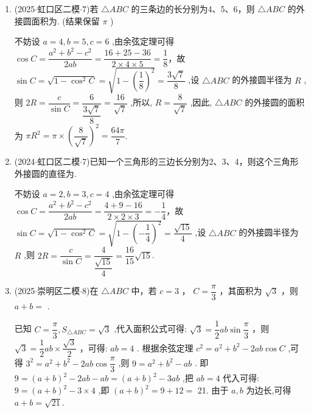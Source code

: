 \begin{enumerate}
    \item (2025$\cdot$虹口区二模$\cdot$7)若 $\bigtriangleup  {ABC}$ 的三条边的长分别为4、5、6，则 $\bigtriangleup  {ABC}$ 的外接圆面积为. (结果保留 $\pi$ )
    \begin{jieda}
        不妨设 $a = 4,b = 5,c = 6$ ,由余弦定理可得 $\cos C =  \dfrac{{a}^{2} + {b}^{2} - {c}^{2}}{2ab} = \dfrac{{16} + {25} - {36}}{2 \times  4 \times  5} = \dfrac{1}{8}$，故 $\sin C =  \sqrt{1 - {\cos }^{2}C} = \sqrt{1 - {\left( \dfrac{1}{8}\right) }^{2}} = \dfrac{3\sqrt{7}}{8}$ ,设 $\bigtriangleup {ABC}$ 的外接圆半径为 $R$ ,则 ${2R} = \dfrac{c}{\sin C} = \dfrac{6}{\dfrac{3\sqrt{7}}{8}} = \dfrac{16}{\sqrt{7}}$ ,所以, $R = \dfrac{8}{\sqrt{7}}$ ,因此, $\bigtriangleup {ABC}$ 的外接圆的面积为 $\pi R^{2} = \pi  \times  {\left( \dfrac{8}{\sqrt{7}}\right) }^{2} = \dfrac{64\pi }{7}$.
    \end{jieda}

    \item (2024$\cdot$虹口区二模$\cdot$7)已知一个三角形的三边长分别为2、3、4，则这个三角形外接圆的直径为.
    \begin{jieda}
        不妨设 $a = 2,b = 3,c = 4$ ,由余弦定理可得 $\cos C =  \dfrac{{a}^{2} + {b}^{2} - {c}^{2}}{2ab} = \dfrac{4 + 9 - 16}{2 \times  2 \times  3} = -\dfrac{1}{4}$，故 $\sin C =  \sqrt{1 - {\cos }^{2}C} = \sqrt{1 - {\left(-\dfrac{1}{4}\right) }^{2}} = \dfrac{\sqrt{15}}{4}$ ,设 $\bigtriangleup {ABC}$ 的外接圆半径为 $R$ ,则 ${2R} = \dfrac{c}{\sin C} = \dfrac{4}{\dfrac{\sqrt{15}}{4}} = \dfrac{16}{15}\sqrt{15}$.
    \end{jieda}

    \item (2025$\cdot$崇明区二模$\cdot$8)在 $\bigtriangleup  {ABC}$ 中，若 $c = 3$ ， $C = \dfrac{\pi }{3}$ ，其面积为 $\sqrt{3}$ ，则 $a + b =$ .
    \begin{jieda}
        已知 $C = \dfrac{\pi }{3},{S}_{\bigtriangleup {ABC}} = \sqrt{3}$ ,代入面积公式可得: $\sqrt{3} =  \dfrac{1}{2}{ab}\sin \dfrac{\pi }{3}$ ，则 $\sqrt{3} = \dfrac{1}{2}{ab} \times  \dfrac{\sqrt{3}}{2}$ ，可得: ${ab} = 4$ . 根据余弦定理 ${c}^{2} = {a}^{2} + {b}^{2} - {2ab}\cos C$ ,可得 ${3}^{2} = {a}^{2} + {b}^{2} - {2ab}\cos \dfrac{\pi }{3}$ ,则 $9 =  {a}^{2} + {b}^{2} - {ab}$ . 即 $9 = {\left( a + b\right) }^{2} - {2ab} - {ab} = {\left( a + b\right) }^{2} - {3ab}$ ,把 ${ab} = 4$ 代入可得: $9 = {\left( a + b\right) }^{2} - 3 \times  4$ ,即 ${\left( a + b\right) }^{2} = 9 + {12} =$ 21. 由于 $a,b$ 为边长,可得 $a + b = \sqrt{21}$.
    \end{jieda}


\end{enumerate}
